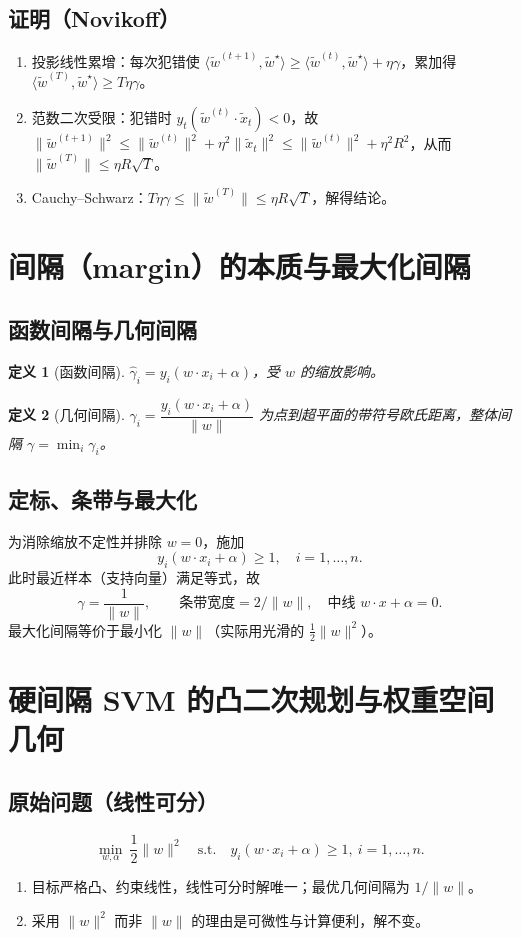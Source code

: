 \documentclass[10.5pt,hyperref,a4paper,UTF8]{ctexart}
\newtheorem{definition}{定义}
\begin{document}
\subsection{证明（Novikoff）}
\begin{enumerate}
  \item 投影线性累增：每次犯错使 $\langle\tilde w^{(t+1)},\tilde w^\star\rangle\ge \langle\tilde w^{(t)},\tilde w^\star\rangle+\eta\gamma$，累加得 $\langle\tilde w^{(T)},\tilde w^\star\rangle\ge T\eta\gamma$。
  \item 范数二次受限：犯错时 $y_t(\tilde w^{(t)}\cdot\tilde x_t)<0$，故 $\|\tilde w^{(t+1)}\|^2\le \|\tilde w^{(t)}\|^2+\eta^2\|\tilde x_t\|^2\le \|\tilde w^{(t)}\|^2+\eta^2R^2$，从而 $\|\tilde w^{(T)}\|\le \eta R\sqrt{T}$。
  \item Cauchy--Schwarz：$T\eta\gamma\le \|\tilde w^{(T)}\|\le \eta R\sqrt{T}$，解得结论。
\end{enumerate}

\section{间隔（margin）的本质与最大化间隔}
\subsection{函数间隔与几何间隔}
\begin{definition}[函数间隔]
$\hat\gamma_i=y_i(w\cdot x_i+\alpha)$，受 $w$ 的缩放影响。
\end{definition}
\begin{definition}[几何间隔]
$\gamma_i=\dfrac{y_i(w\cdot x_i+\alpha)}{\|w\|}$ 为点到超平面的带符号欧氏距离，整体间隔 $\gamma=\min_i\gamma_i$。
\end{definition}

\subsection{定标、条带与最大化}
为消除缩放不定性并排除 $w=0$，施加
\[
y_i(w\cdot x_i+\alpha)\ge 1,\quad i=1,\dots,n.
\]
此时最近样本（支持向量）满足等式，故
\[
\gamma=\frac{1}{\|w\|},\qquad \text{条带宽度}=2/\|w\|,\quad \text{中线 }w\cdot x+\alpha=0.
\]
最大化间隔等价于最小化 $\|w\|$（实际用光滑的 $\tfrac12\|w\|^2$）。

\section{硬间隔 SVM 的凸二次规划与权重空间几何}
\subsection{原始问题（线性可分）}
\[
\boxed{\ \min_{w,\alpha}\ \frac12\|w\|^2\quad \text{s.t.}\quad y_i(w\cdot x_i+\alpha)\ge 1,\ i=1,\dots,n.\ }
\]
\begin{enumerate}
  \item 目标严格凸、约束线性，线性可分时解唯一；最优几何间隔为 $1/\|w\|$。
  \item 采用 $\|w\|^2$ 而非 $\|w\|$ 的理由是可微性与计算便利，解不变。
\end{enumerate}
\end{document}
